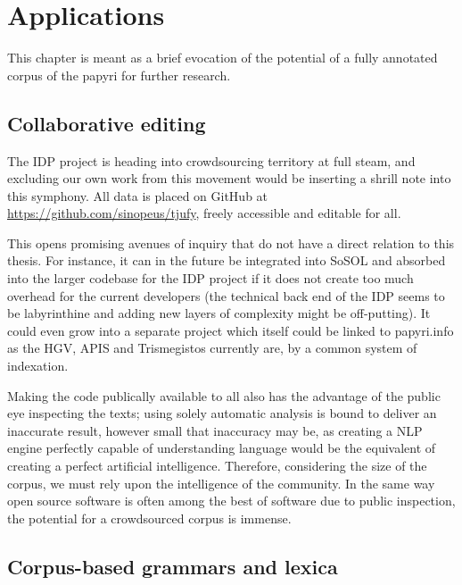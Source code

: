 \chapter{Applications} %
\label{cha:applications}

This chapter is meant as a brief evocation of the potential of a fully
annotated corpus of the papyri for further research.

\section{Collaborative editing} %
\label{sec:collaborativeediting}

The IDP project is heading into crowdsourcing territory at full steam, and
excluding our own work from this movement would be inserting a shrill note into
this symphony. All data is placed on GitHub at
\url{https://github.com/sinopeus/tjufy}, freely accessible and editable for
all. 

This opens promising avenues of inquiry that do not have a direct relation
to this thesis. For instance, it can in the future be integrated into SoSOL and
absorbed into the larger codebase for the IDP project if it does not create too
much overhead for the current developers (the technical back end of the IDP
seems to be labyrinthine and adding new layers of complexity might be
off-putting). It could even grow into a separate project which itself could be
linked to papyri.info as the HGV, APIS and Trismegistos currently are, by a
common system of indexation.

Making the code publically available to all also has the advantage of the
public eye inspecting the texts; using solely automatic analysis is bound to
deliver an inaccurate result, however small that inaccuracy may be, as creating
a NLP engine perfectly capable of understanding language would be the
equivalent of creating a perfect artificial intelligence. Therefore,
considering the size of the corpus, we must rely upon the intelligence of the
community. In the same way open source software is often among the best of
software due to public inspection, the potential for a crowdsourced corpus is
immense.


\section{Corpus-based grammars and lexica} %
\label{sec:corpusbasedgrammars}

